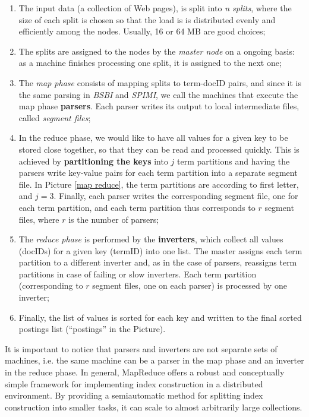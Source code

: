 \begin{enumerate}
    \item The input data (a collection of Web pages), is split into \textit{n splits}, where the size of each split is chosen so that the load is is distributed evenly and efficiently among the nodes. Usually, 16 or 64 MB are good choices;
    \item The splits are assigned to the nodes by the \textit{master node} on a ongoing basis: as a machine finishes processing one split, it is assigned to the next one;
    \item The \textit{map phase} consists of mapping splits to term-docID pairs, and since it is the same parsing in \textit{BSBI} and \textit{SPIMI}, we call the machines that execute the map phase \textbf{parsers}. Each parser writes its output to local intermediate files, called \textit{segment files};
    \item In the reduce phase, we would like to have all values for a given key to be stored close together, so that they can be read and processed quickly. This is achieved by \textbf{partitioning the keys} into $j$ term partitions and having the parsers write key-value pairs for each term partition into a separate segment file. In Picture \ref{map reduce}, the term partitions are according to first letter, and $j = 3$. Finally, each parser writes the corresponding segment file, one for each term partition, and each term partition thus corresponds to $r$ segment files, where $r$ is the number of parsers;
    \item The \textit{reduce phase} is performed by the \textbf{inverters}, which collect all values (docIDs) for a given key (termID) into one list. The master assigns each term partition to a different inverter and, as in the case of parsers, reassigns term partitions in case of failing or slow inverters. Each term partition (corresponding to $r$ segment files, one on each parser) is processed by one inverter;
    \item  Finally, the list of values is sorted for each key and written to the final sorted postings list (“postings” in the Picture).
\end{enumerate}

It is important to notice that parsers and inverters are not separate sets of machines, i.e. the same machine can be a parser in the map phase and an inverter in the reduce phase. In general, MapReduce offers a robust and conceptually simple framework for implementing index construction in a distributed environment. By providing a semiautomatic method for splitting index construction into smaller tasks, it can scale to almost arbitrarily large collections.

